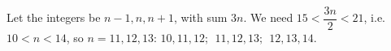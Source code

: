 Let the integers be $n-1,n,n+1$, with sum $3n$. We need $15<\dfrac{3n}{2}<21$, i.e. $10<n<14$, so $n=11,12,13$: $\boxed{10,11,12;\ \ 11,12,13;\ \ 12,13,14}$.
